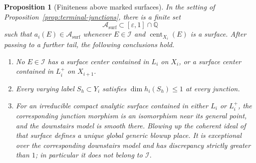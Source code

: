 \documentclass[11pt]{amsart}
\newtheorem{proposition}[theorem]{Proposition}
\theoremstyle{definition}
\theoremstyle{remark}
\numberwithin{equation}{section}
\newcommand{\Q}{\mathbb{Q}}
\DeclareMathOperator{\cent}{cent}
\begin{document}
\begin{proposition}[Finiteness above marked surfaces]\label{prop:surface-finiteness}
In the setting of Proposition~\ref{prop:terminal-junctions}, there is a
finite set
\[
                    \mathcal A_{\mathrm{surf}}
                    \subset [\varepsilon,1]\cap\Q
\]
such that $a_i(E)\in\mathcal A_{\mathrm{surf}}$ whenever
$E\in\mathcal I$ and $\cent_{X_i}(E)$ is a surface.  After passing to a
further tail, the following conclusions hold.
\begin{enumerate}
\item No $E\in\mathcal I$ has a surface center contained in $L_i$ on
$X_i$, or a surface center contained in $L_i^+$ on $X_{i+1}$.
\item Every varying label $S_h\subset Y_i$ satisfies
$\dim h_i(S_h)\leq1$ at every junction.
\item For an irreducible compact analytic surface contained in either $L_i$
or $L_i^+$, the corresponding
junction morphism is an isomorphism near its general point, and the
downstairs model is smooth there.  Blowing up the coherent ideal of that
surface defines a unique global generic blowup place.  It is exceptional
over the corresponding downstairs model and has discrepancy strictly
greater than $1$; in particular it does not belong to $\mathcal I$.
\end{enumerate}
\end{proposition}
\end{document}
